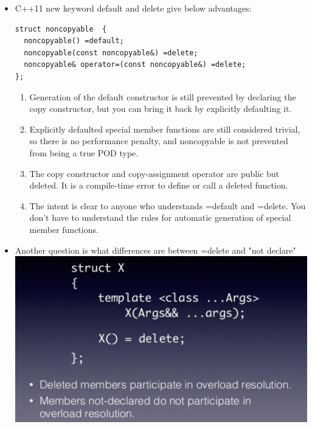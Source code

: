 \documentclass[a4paper,11pt,twoside]{book}
\begin{document}
\begin{itemize}
\item C++11 new keyword default and delete give below advantages:
\begin{lstlisting}[numbers=none]
struct noncopyable  {
  noncopyable() =default;
  noncopyable(const noncopyable&) =delete;
  noncopyable& operator=(const noncopyable&) =delete;
};
\end{lstlisting}

\begin{enumerate}
	\item Generation of the default constructor is still prevented by declaring the copy constructor, but you can bring it back by explicitly defaulting it.

	\item Explicitly defaulted special member functions are still considered trivial, so there is no performance penalty, and noncopyable is not prevented from being a true POD type.

	\item The copy constructor and copy-assignment operator are public but deleted. It is a compile-time error to define or call a deleted function.

	\item The intent is clear to anyone who understands =default and =delete. You don't have to understand the rules for automatic generation of special member functions.
\end{enumerate}

	\item Another question is what differences are between =delete and "not declare"
\\
\includegraphics[scale=0.6]{pics/sm5.png} \newline

\end{itemize}
\end{document}
